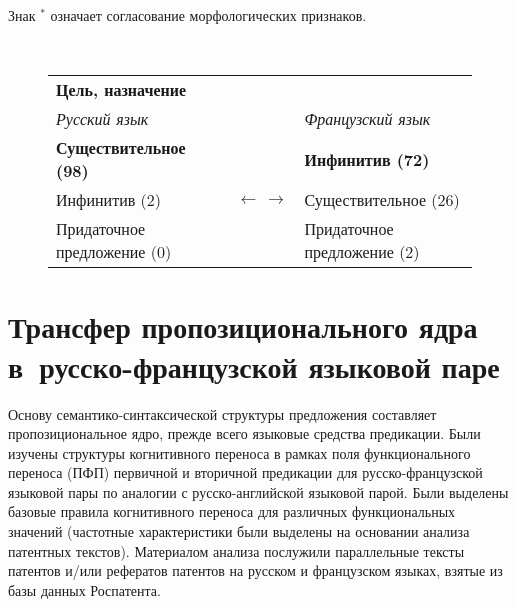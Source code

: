 \begin{multicols}{2}
     Знак $^*$ означает согласование морфологических признаков.
     
\begin{figure*}[b] %
\vspace*{6pt}
\begin{center}
\mbox{%
\epsfxsize=159.941mm
}
\end{center}
\vspace*{-9pt}
\vspace*{12pt}
     \begin{center}
     {\tabcolsep=3pt
     \begin{tabular}{lcl}
     \textbf{Цель, назначение} &&\\
     \textit{Русский язык} &&\textit{Французский язык}\\
     \textbf{Существительное (98)} &&\textbf{Инфинитив (72)}\\
     Инфинитив (2)  &$\leftarrow\,\rightarrow$ &Существительное (26)\\
     Придаточное предложение (0)&&Придаточное предложение (2)
     \end{tabular}
     }
          \end{center}
          \vspace*{-6pt}
\end{figure*}


     
\section{Трансфер пропозиционального ядра в~русско-французской 
языковой паре}
       
     Основу семантико-синтаксической структуры предложения составляет 
пропозициональное ядро, прежде всего языковые средства предикации. Были 
изучены структуры когнитивного переноса в \mbox{рамках} поля функционального 
переноса (ПФП) первичной и вторичной предикации для 
     рус\-ско-фран\-цуз\-ской языковой пары по аналогии с 
     рус\-ско-анг\-лий\-ской языковой парой. Были выделены базовые 
правила когнитивного переноса для различных функциональных значений 
(частотные характеристики были выделены на основании анализа патентных 
текстов). Материалом анализа послужили параллельные тексты патентов 
и/или рефератов патентов на русском и французском языках, взятые из базы 
данных Роспатента.
     

\end{multicols}

